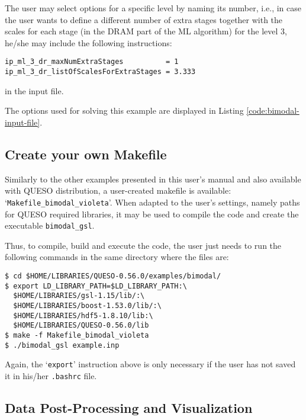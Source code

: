 The user may select options for a specific level by naming its number, i.e., in case the user wants to define a different number of extra stages together with the scales for each stage (in the DRAM part of the ML algorithm) for the level 3, he/she may include the following instructions:
\begin{lstlisting}
ip_ml_3_dr_maxNumExtraStages          = 1
ip_ml_3_dr_listOfScalesForExtraStages = 3.333
\end{lstlisting}
in the input file.


The options used for solving this example are displayed in Listing \ref{code:bimodal-input-file}. 





\subsection{Create your own Makefile}\label{sec:bimodal-makefile}

Similarly to the other examples presented in this user's manual and also available with QUESO distribution, a user-created makefile is available: `\texttt{Makefile\_bimodal\_violeta}'. When adapted to the user's settings, namely paths for  QUESO required libraries, it may be used to compile the code and create the executable \verb+bimodal_gsl+. 

Thus, to compile, build and execute the code, the user just needs to run the following commands in the same directory where the files are:
\begin{lstlisting}
$ cd $HOME/LIBRARIES/QUESO-0.56.0/examples/bimodal/
$ export LD_LIBRARY_PATH=$LD_LIBRARY_PATH:\
  $HOME/LIBRARIES/gsl-1.15/lib/:\
  $HOME/LIBRARIES/boost-1.53.0/lib/:\
  $HOME/LIBRARIES/hdf5-1.8.10/lib:\
  $HOME/LIBRARIES/QUESO-0.56.0/lib 
$ make -f Makefile_bimodal_violeta 
$ ./bimodal_gsl example.inp
\end{lstlisting}

Again, the `\verb+export+' instruction above is only necessary if the user has not saved it in his/her \verb+.bashrc+ file. 


\subsection{Data Post-Processing and Visualization}\label{sec:bimodal-results}



